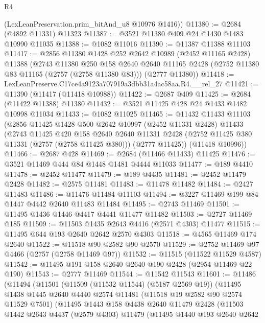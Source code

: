 \begin{lexlean}{R4}
\begin{coremodule}
      (LexLeanPreservation.prim_bitAnd_u8 @10976 @1416))
@11380 := @2684 (@4892 @11331) @11323
@11387 := @3521 @11380 @409 @24 @1430 @1483 @10990 @11035
@11388 := @1082 @11016
@11390 := @11387 @11388 @11103
@11417 := @2856
    @11380
    @1428
    @252
    @2642
    @10989
    (@2452 @11165 @2428)
    @11388
    (@2743
      @11380
      @250
      @158
      @2640
      @2640
      @11165
      @2428
      (@2752 @11380 @83 @11165 (@2757 (@2758 @11380 @83)))
      (@2777 @11380))
@11418 := LexLeanPreserve.C17ce4a9123a707919a3dbb31a4ac58aa.R4.__rel_27
@11421 := @11390 (@11417 (@11418 @10988))
@11422 := @2687 @409
@11425 := @2684 (@11422 @11388) @11380
@11432 := @3521 @11425 @428 @24 @1433 @1482 @10998 @11034
@11433 := @1082 @11025
@11465 := @11432
    @11433
    @11103
    (@2856
      @11425
      @1428
      @500
      @2642
      @10997
      (@2452 @11331 @2428)
      @11433
      (@2743
        @11425
        @420
        @158
        @2640
        @2640
        @11331
        @2428
        (@2752 @11425 @380 @11331 (@2757 (@2758 @11425 @380)))
        (@2777 @11425))
      (@11418 @10996))
@11466 := @2687 @428
@11469 := @2684 (@11466 @11433) @11425
@11476 := @3521 @11469 @444 @84 @1448 @1481 @4444 @11033
@11477 := @189 @4410
@11478 := @2452 @11477
@11479 := @189 @4435
@11481 := @2452 @11479 @2428
@11482 := @2575 @11481
@11483 := @11478 @11482
@11484 := @2427 @11483
@11486 := @11476 @11484 @11103
@11494 := @3227 @11469 @199 @84 @1447 @4442 @2640 @11483 @11484
@11495 := @2743 @11469
@11501 := @11495 @1436 @1446 @4417 @4441 @11477 @11482
@11503 := @2727 @11469 @185
@11509 := @11503 @1435 @2643 @4416 (@2571 @4303) @11477
@11515 := @11495 @644 @193 @2640 @2642 @2570 @4303
@11518 := @4565 @11469 @174 @2640
@11522 := @11518 @90 @2582 @90 @2570
@11529 := @2752 @11469 @97 @4466 (@2757 (@2758 @11469 @97))
@11532 := @11515 (@11522 @11529 @4587)
@11542 := @11495 @191 @158 @2640 @2640 @190 @2428 (@2954 @11469 @22 @190)
@11543 := @2777 @11469
@11544 := @11542 @11543
@11601 := @11486
    (@11494
      (@11501
        (@11509 (@11532 @11544) (@5187 @2569 @19))
        (@11495
          @1438
          @1445
          @2640
          @4440
          @2574
          @11481
          (@11518 @19 @2582 @90 @2574 @11529 @7501)
          (@11495
            @1443
            @158
            @4438
            @2640
            @11479
            @2428
            (@11503
              @1442
              @2643
              @4437
              (@2579 @4303)
              @11479
              (@11495
                @1440
                @193
                @2640
                @2642

\end{coremodule}
\end{lexlean}
